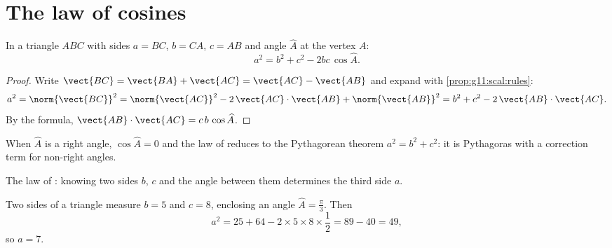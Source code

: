 \section{The law of cosines}

\begin{theorem}\label{thm:g11:scal:cosines}
In a triangle $ABC$ with sides $a = BC$, $b = CA$, $c = AB$ and angle
$\widehat A$ at the vertex $A$:
\[
a^2 = b^2 + c^2 - 2bc\,\cos\widehat A .
\]
\end{theorem}

\begin{proof}
Write $\vect{BC} = \vect{BA} + \vect{AC} = \vect{AC} - \vect{AB}$ and
expand with \cref{prop:g11:scal:rules}:
\[
a^2 = \norm{\vect{BC}}^2
= \norm{\vect{AC}}^2 - 2\,\vect{AC}\cdot\vect{AB} + \norm{\vect{AB}}^2
= b^2 + c^2 - 2\,\vect{AB}\cdot\vect{AC}.
\]
By the  formula,
$\vect{AB}\cdot\vect{AC} = c\,b\,\cos\widehat A$.
\end{proof}

\begin{remark}
When $\widehat A$ is a right angle, $\cos\widehat A = 0$ and the law of
 reduces to the Pythagorean theorem $a^2 = b^2 + c^2$: it is
Pythagoras with a correction term for non-right angles.
\end{remark}

\begin{omfigure}

{\small The law of : knowing two sides $b$, $c$ and the angle
between them determines the third side $a$.}
\end{omfigure}

\begin{example}\label{ex:g11:scal:cosines}
Two sides of a triangle measure $b = 5$ and $c = 8$, enclosing an angle
$\widehat A = \frac\pi3$. Then
\[
a^2 = 25 + 64 - 2 \times 5 \times 8 \times \frac12 = 89 - 40 = 49,
\]
so $a = 7$.
\end{example}

